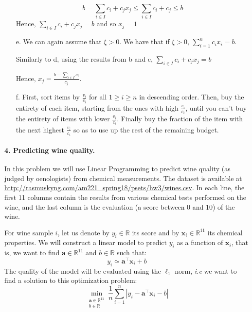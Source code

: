\documentclass[11pt]{article}
\theoremstyle{remark}
\newcommand{\R}{\mathbb{R}}                     %
\newcommand{\bx}{\mathbf{x}}
\newcommand{\ba}{\mathbf{a}}
\begin{document}
\begin{itemize}
$$b= \sum_{i\in I} c_i + c_j x_j \leq \sum_{i\in I} c_i  + c_j  \leq b$$
Hence, $\sum_{i\in I} c_i  + c_j  x_j= b$ and so $x_j = 1$

\item[e.]
We can again assume that $\xi >0$.
We have that if $\xi > 0$, $\sum_{i=1}^n c_i x_i =b$.  

Similarly to d, using the results from b and c, $\sum_{i\in I} c_i  + c_j x_j  = b$

Hence, $x_j = \frac{b-\sum_{i\in I} c_i}{c_j}$.

\item[f.]
First, sort items by $\frac{v_i}{c_i}$ for all $1 \geq i \geq n$ in descending order. Then, buy the entirety of each item, starting from the ones with high $\frac{v_i}{c_i}$, until you can't buy the entirety of items with lower $\frac{v_i}{c_i}$. Finally buy the fraction of the item with the next highest $\frac{v_i}{c_i}$ so as to use up the rest of the remaining budget.

\end{itemize}

\color{black}

\paragraph{4. Predicting wine quality.}

In this problem we will use Linear Programming to predict wine quality (as
judged by oenologists) from chemical measurements. The dataset is available at 
\url{http://rasmuskyng.com/am221_spring18/psets/hw3/wines.csv}. In each line, the first 11 columns
contain the results from various chemical tests performed on the wine, and the
last column is the evaluation (a score between 0 and 10) of the wine.

For wine sample $i$, let us denote by $y_i\in\R$ its score and by
$\bx_i\in\R^{11}$ its chemical properties. We will construct a linear model to
predict $y_i$ as a function of $\bx_i$, that is, we want to find
$\ba\in\R^{11}$ and $b\in\R$ such that:
\begin{displaymath}
    y_i\simeq \ba^\intercal \bx_i + b
\end{displaymath}
The quality of the model will be evaluated using the $\ell_1$ norm, \emph{i.e}
we want to find a solution to this optimization problem:
\begin{displaymath}
    \min_{\substack{\ba\in\R^{11}\\ b\in\R}} \frac{1}{n}\sum_{i=1}^n \left|y_i - \ba^\intercal \bx_i - b\right|
\end{displaymath}
\end{document}
